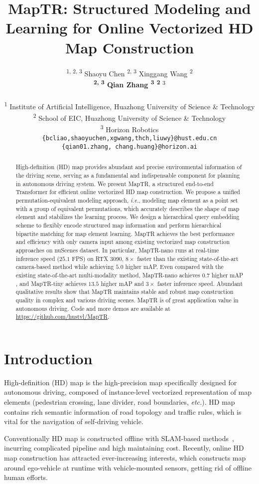 \documentclass{article} \usepackage{iclr2023_conference,times}
\title{MapTR: Structured Modeling and Learning for Online Vectorized HD Map Construction}
\author{\quad\quad\quad{Bencheng Liao} \textsuperscript{1, 2, 3}\footnotemark[1] \quad
{Shaoyu Chen} \textsuperscript{2, 3} \footnotemark[1] \quad
 {Xinggang Wang} \textsuperscript{2} \footnotemark[2] \\
\textbf{\quad\quad\quad{Tianheng Cheng} \textsuperscript{2, 3}  \quad
{Qian Zhang} \textsuperscript{3} \quad {Wenyu Liu}\textsuperscript{2} \quad {Chang Huang}}\textsuperscript{3}
\\
\\
\quad\quad\quad \textsuperscript{1} Institute of Artificial Intelligence, Huazhong University of Science \& Technology \\
\quad\quad\quad \textsuperscript{2} School of EIC, Huazhong University of Science \& Technology \\
\quad\quad\quad \textsuperscript{3} Horizon Robotics \\
\texttt{\quad\quad\quad \{bcliao,shaoyuchen,xgwang,thch,liuwy\}@hust.edu.cn} \\
\texttt{\quad\quad\quad \{qian01.zhang, chang.huang\}@horizon.ai}
}
\def\ie{\emph{i.e.}} \def\Ie{\emph{I.e.}}
\def\etc{\emph{etc.}}
\begin{document}
\maketitle

\begin{abstract}
High-definition (HD) map provides abundant and precise environmental information of the driving scene, serving as a fundamental and indispensable component for planning in autonomous driving system.
We present MapTR, a structured end-to-end Transformer for efficient online vectorized HD map construction. We propose a unified permutation-equivalent modeling approach,
\ie, modeling map element as a point set with a group of equivalent permutations, which accurately describes the shape of map element and stabilizes the learning process. We design a hierarchical query embedding scheme to flexibly encode structured map information and perform hierarchical bipartite matching for map element learning. 
MapTR achieves the best performance and efficiency with only camera input among existing vectorized map construction approaches on nuScenes dataset. In particular, MapTR-nano runs at real-time inference speed ($25.1$ FPS) on RTX 3090, $8\times$ faster than the existing state-of-the-art camera-based method while achieving $5.0$ higher mAP. Even compared with the existing state-of-the-art multi-modality method, MapTR-nano achieves $0.7$ higher mAP 
, and MapTR-tiny achieves $13.5$ higher mAP and $3\times$ faster inference speed. Abundant qualitative results show that MapTR maintains stable and robust map construction quality in complex and various driving scenes. MapTR is of great application value in autonomous driving. Code and more demos are available at \url{https://github.com/hustvl/MapTR}.
\end{abstract}


\section{Introduction}
High-definition (HD)  map is the high-precision  map specifically designed for autonomous driving, composed of instance-level vectorized representation of  map elements (pedestrian crossing, lane divider, road boundaries, \etc). HD map contains rich semantic information of road topology and traffic rules, which is vital for the navigation of self-driving vehicle. 

Conventionally HD map is constructed offline with SLAM-based methods~\citep{loam,legoloam,liosam}, incurring complicated pipeline and high maintaining cost. Recently, online HD map construction has attracted ever-increasing interests, which constructs map around ego-vehicle at runtime with vehicle-mounted sensors, getting rid of offline human efforts.
\end{document}

